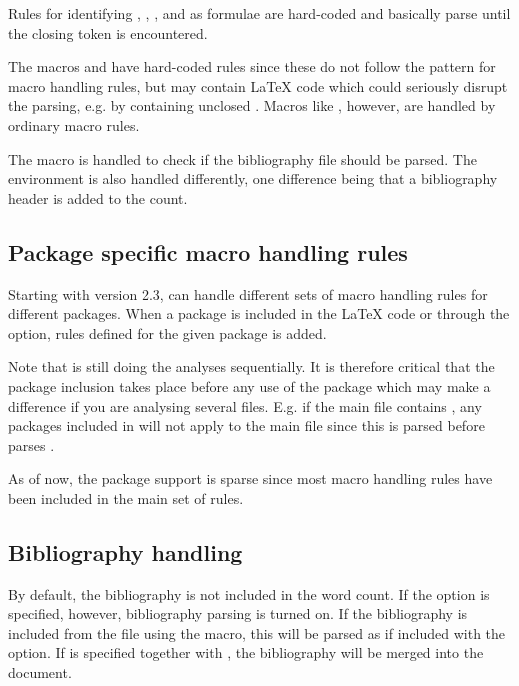 \documentclass{article}
\begin{document}
Rules for identifying \code{\$\ldots\$}, \code{\$\$\ldots\$\$}, \code{\bs(\ldots\bs)}, and \code{\bs[\ldots\bs]} as formulae are hard-coded and basically parse until the closing token is encountered.

The macros  and  have hard-coded rules since these do not follow the pattern for macro handling rules, but may contain \LaTeX{} code which could seriously disrupt the parsing, e.g. by containing unclosed . Macros like , however, are handled by ordinary macro rules.

The macro  is handled to check if the bibliography file should be parsed. The  environment is also handled differently, one difference being that a bibliography header is added to the count.


\subsection{Package specific macro handling rules}

Starting with version 2.3, \TeXcount{} can handle different sets of macro handling rules for different packages. When a package is included in the \LaTeX{} code or through the  option, rules defined for the given package is added.

Note that \TeXcount{} is still doing the analyses sequentially. It is therefore critical that the package inclusion takes place before any use of the package which may make a difference if you are analysing several files. E.g. if the main file contains , any packages included in  will not apply to the main file since this is parsed before \TeXcount{} parses .

As of now, the package support is sparse since most macro handling rules have been included in the main set of rules.


\subsection{Bibliography handling}

By default, the bibliography is not included in the word count. If the  option is specified, however, bibliography parsing is turned on. If the bibliography is included from the  file using the  macro, this will be parsed as if included with the  option. If  is specified together with , the bibliography will be merged into the document.
\end{document}
